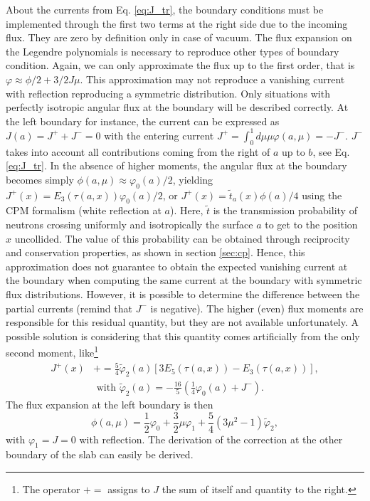 \documentclass{ictt26}
\newcommand{\pluseq}{\mathrel{+}=}
\begin{document}
About the currents from Eq. \ref{eq:J_tr}, the boundary conditions must be implemented through the first two terms at the right side due to the incoming flux. They are zero by definition only in case of vacuum. The flux expansion on the Legendre polynomials is necessary to reproduce other types of boundary condition. Again, we can only approximate the flux up to the first order, that is $\varphi \approx \phi/2 + 3/2 J \mu$. This approximation may not reproduce a vanishing current with reflection reproducing a symmetric distribution. Only situations with perfectly isotropic angular flux at the boundary will be described correctly. At the left boundary for instance, the current can be expressed as $J(a) =  J^+ + J^- = 0$ with the entering current $J^+ = \int_0^1 { d\mu \mu \varphi(a, \mu) } = - J^-$. $J^-$ takes into account all contributions coming from the right of $a$ up to $b$, see Eq. \ref{eq:J_tr}. In the absence of higher moments, the angular flux at the boundary becomes simply $\phi(a, \mu) \approx \varphi_0(a) / 2$, yielding $J^+(x) = E_3 \left(\tau(a, x)\right) \varphi_0(a)/2$, or $J^+(x) = \tilde{t}_a(x) \phi(a)/4$ using the CPM formalism (white reflection at $a$). Here, $\tilde{t}$ is the transmission probability of neutrons crossing uniformly and isotropically the surface $a$ to get to the position $x$ uncollided. The value of this probability can be obtained through reciprocity and conservation properties, as shown in section \ref{sec:cp}. Hence, this approximation does not guarantee to obtain the expected vanishing current at the boundary when computing the same current at the boundary with symmetric flux distributions. However, it is possible to determine the difference between the partial currents (remind that $J^-$ is negative). The higher (even) flux moments are responsible for this residual quantity, but they are not available unfortunately. A possible solution is considering that this quantity comes artificially from the only second moment, like\footnote{The operator $\pluseq$ assigns to $J$ the sum of itself and quantity to the right.}
\begin{equation}
\begin{split}
J^+(x) &\pluseq \frac{5}{4} \tilde{\varphi}_2(a) \left[ 3 E_5(\tau(a, x)) - E_3(\tau(a, x)) \right],\\ &\text{ with } \tilde{\varphi}_2(a) = - \frac{16}{5} \left( \frac{1}{4} \varphi_0(a) + J^- \right).
\end{split}
\end{equation}
The flux expansion at the left boundary is then
\[ \phi(a, \mu) = \frac{1}{2} \varphi_0 + \frac{3}{2} \mu \varphi_1 + \frac{5}{4} \left( 3 \mu^2 - 1 \right) \tilde{\varphi}_2, \]
with $\varphi_1 = J = 0$ with reflection. The derivation of the correction at the other boundary of the slab can easily be derived.
\end{document}
